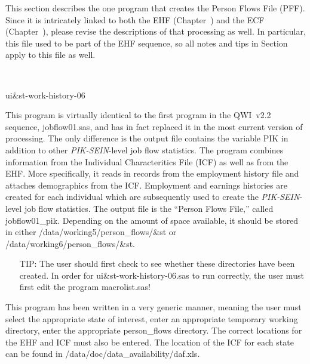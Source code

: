                       

%
%

% 


This section describes the one program that creates the Person Flows File
(PFF). Since it is intricately linked to both the EHF
(Chapter~) and the ECF
(Chapter~), please revise the descriptions of that
processing as well. In particular, this file used to be part of the EHF
sequence, so all notes and tips in Section~ apply to
this file as well.

\begin{description}
\item \ 
  \begin{steps}
                                
\item ui{\&}st-work-history-06
 
  This program is virtually identical to the first program in the QWI~v2.2
  sequence, jobflow01.sas, and has in fact replaced it in the most current
  version of processing. The only difference is the output file contains
  the variable PIK\index{PIK} in addition to other
  \textit{PIK-SEIN}-level job flow statistics. The program
  combines information from the Individual Characteritics File
  (ICF) as well as from the EHF. More specifically, it reads in
  records from the employment history file and attaches demographics from
  the ICF. Employment and earnings histories are created for each
  individual which are subsequently used to create the
  \textit{PIK-SEIN}-level job flow statistics. The output file is the
  ``Person Flows File,'' called jobflow01{\_}pik. Depending on the amount
  of space available, it should be stored in either
  /data/working5/person{\_}flows/{\&}st or
  /data/working6/person{\_}flows/{\&}st.
 
 \begin{itemize}
 \item[TIP:] The user should first check to see whether these directories have
   been created. In order for ui{\&}st-work-history-06.sas to run correctly,
   the user must first edit the program macrolist.sas! 
 
 \end{itemize}
 
 This program has been written in a 
 very generic manner, meaning the user must select the appropriate state of 
 interest, enter an appropriate temporary working directory, enter the 
 appropriate person{\_}flows directory. The correct locations for the EHF and 
 ICF must also be entered. The location of the ICF\index{ICF} for each state can be 
 found in /data/doc/data{\_}availability/daf.xls. 
\end{steps}
\end{description}


